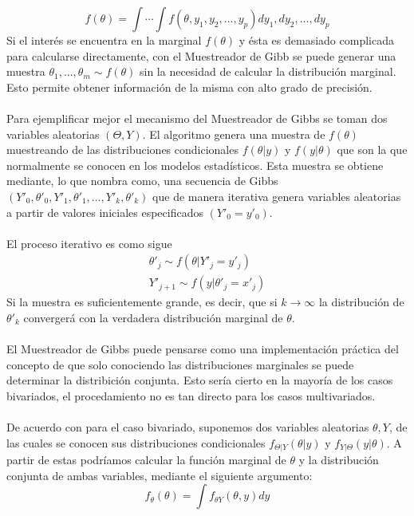 \[f(\theta)=\int \cdots \int f(\theta,y_1,y_2,...,y_p) dy_1,dy_2,...,dy_p\]
Si el inter\'es se encuentra en la marginal $f(\theta)$ y \'esta es demasiado complicada para calcularse directamente, con el Muestreador de Gibb se puede generar una muestra $\theta_1,...,\theta_m \sim f(\theta)$ sin la necesidad de calcular la distribuci\'on marginal. Esto permite obtener informaci\'on de la misma con alto grado de precisi\'on.\\
\\
Para ejemplificar mejor el mecanismo del Muestreador de Gibbs se toman dos variables aleatorias $(\Theta,Y)$. El algoritmo genera una muestra de $f(\theta)$ muestreando de las distribuciones condicionales $f(\theta|y)$ y $f(y|\theta)$ que son la que normalmente se conocen en los modelos estad\'isticos. Esta muestra se obtiene mediante, lo que \cite{casella1992explaining} nombra como, una secuencia de Gibbs $(Y'_0,\theta'_0,Y'_1,\theta'_1,...,Y'_k,\theta'_k)$ que de manera iterativa genera variables aleatorias a partir de valores iniciales especificados $(Y'_0=y'_0)$.\\
\\El proceso iterativo es como sigue\\
\begin{align*}
\theta'_j \sim f(\theta|Y'_j=y'_j)\\
Y'_{j+1} \sim f(y|\theta'_j=x'_j)
\end{align*}
Si la muestra es suficientemente grande, es decir, que si $k \rightarrow \infty$ la distribuci\'on de $\theta'_k$ converger\'a con la verdadera distribuci\'on marginal de $\theta$.\\
\\
El Muestreador de Gibbs puede pensarse como una implementaci\'on pr\'actica del concepto de que solo conociendo las distribuciones marginales se puede determinar la distribici\'on conjunta. Esto ser\'ia cierto en la mayor\'ia de los casos bivariados, el procedamiento no es tan directo para los casos multivariados.\\
\\
De acuerdo con \cite{casella1992explaining} para el caso bivariado, suponemos dos variables aleatorias $\theta,Y$, de las cuales se conocen sus distribuciones condicionales $f_{\Theta|Y}(\theta|y)$ y $f_{Y|\Theta}(y|\theta)$. A partir de estas podr\'iamos calcular la funci\'on marginal de $\theta$ y la distribuci\'on conjunta de ambas variables, mediante  el siguiente argumento:\\
\[f_\theta(\theta)=\int f_{\theta Y}(\theta,y)dy\]
